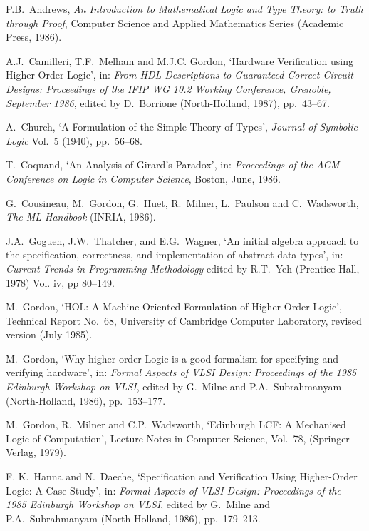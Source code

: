 \begin{thebibliography}{99}

P.B.\ Andrews,
{\it An Introduction to Mathematical Logic 
     and Type Theory: to Truth through Proof},
Computer Science and Applied Mathematics Series
(Academic Press, 1986).

A.J.\ Camilleri, T.F.\ Melham and M.J.C. Gordon,
`Hardware Verification using Higher-Order Logic',
in: {\it From HDL Descriptions to Guaranteed Correct \mbox{Circuit}
Designs: Proceedings of the IFIP WG 10.2 Working Conference, Grenoble, 
September 1986}, edited by D.\ Borrione (North-Holland, 1987), pp.\ 43--67.

A.\ Church, 
`A Formulation of the Simple Theory of Types',
{\it Journal of Symbolic Logic} Vol.\ 5 (1940), pp.\ 56--68.

T.\ Coquand, `An Analysis of Girard's Paradox',
in: {\it Proceedings of the ACM Conference on
Logic in Computer Science\/}, Boston, June, 1986.

G.\ Cousineau, M.\ Gordon, G.\ Huet, R.\ Milner,
L.\ Paulson and C.\ Wadsworth,
{\it The ML Handbook} ({\small INRIA}, 1986).

J.A.\ Goguen, J.W.\ Thatcher, and E.G.\ Wagner,
`An initial algebra \mbox{approach} to the specification, 
correctness, and implementation of abstract data types',
in: {\it Current Trends in Programming Methodology\/}
edited by R.T.\ Yeh (Prentice-Hall, 1978)
Vol. {\sc iv}, pp 80--149.

M.\ Gordon, 
`HOL: A Machine Oriented Formulation of Higher-Order Logic',
Technical Report No.\ 68,
University of Cambridge Computer Laboratory, revised version
(July 1985).

M.\ Gordon, 
`Why higher-order Logic
is a good formalism for specifying and verifying hardware',
in: {\it Formal Aspects of VLSI Design: Proceedings of the 1985 Edinburgh
      Workshop on VLSI\/}, edited by G.\ Milne and
P.A.\ Subrahmanyam (North-Holland, 1986), pp.\ 153--177.

M.\ Gordon, R.\ Milner and C.P.\ Wadsworth, 
`Edinburgh LCF: A Mechanised Logic of Computation',
Lecture Notes in Computer Science, Vol.\ 78,
(Springer-Verlag, 1979).

F. K.\ Hanna and N.\ Daeche,
`Specification and Verification Using Higher-Order Logic: A Case Study',
in: {\it Formal Aspects of VLSI Design: Proceedings of the 1985 Edinburgh
      Workshop on VLSI\/}, edited by G.\ Milne and
P.A.\ Subrahmanyam (North-Holland, 1986), pp.\ 179--213.


\end{thebibliography}
